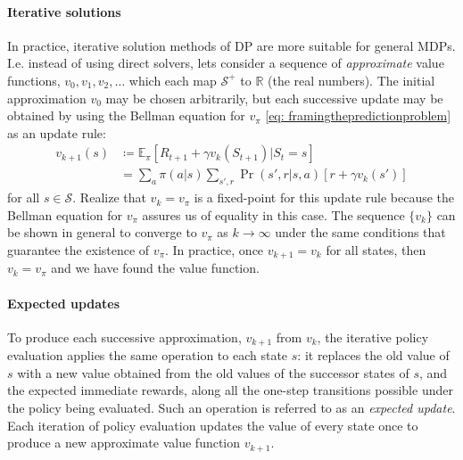 \documentclass[12pt]{article}
\begin{document}
\paragraph{Iterative solutions}
In practice, iterative solution methods of DP are more suitable for general MDPs. I.e. instead of using direct solvers, lets consider a sequence of \emph{approximate} value functions, $v_0, v_1, v_2, \ldots$ which each map $\mathcal S^+$ to $\mathbb R$ (the real numbers). 
The initial approximation $v_0$ may be chosen arbitrarily, but each successive update may be obtained by using the Bellman equation for $v_\pi$ \ref{eq:   framingthepredictionproblem} as an update rule:
\begin{align}
  \label{eq: expectedupdate}
  v_{k+1}(s) &\coloneqq \mathbb E_\pi \left[R_{t+1} + \gamma v_k(S_{t+1}) | S_t     = s \right] \\
&= \sum_a \pi(a|s) \sum_{s',r} \Pr(s',r|s,a) \left[ r + \gamma v_k(s')\right] \nonumber
\end{align}
for all $s \in \mathcal S$. Realize that $v_k = v_\pi$ is a fixed-point for this update rule because the Bellman equation for $v_\pi$ assures us of equality in this case. The sequence $\{v_k\}$ can be shown in general to converge to $v_\pi$ as $k\to \infty$ under the same conditions that guarantee the existence of $v_\pi$. In practice, once $v_{k+1} = v_k$ for all states, then $v_{k} = v_\pi$ and we have found the value function.

\paragraph{Expected updates} To produce each successive approximation, $v_{k+1}$ from $v_k$, the iterative policy evaluation applies the same operation to each state $s$: it replaces the old value of $s$ with a new value obtained from the old values of the successor states of $s$, and the expected immediate rewards, along all the one-step transitions possible under the policy being evaluated. Such an operation is referred to as an \emph{expected update}. Each iteration of policy evaluation updates the value of every state once to produce a new approximate value function $v_{k+1}$.
\end{document}
